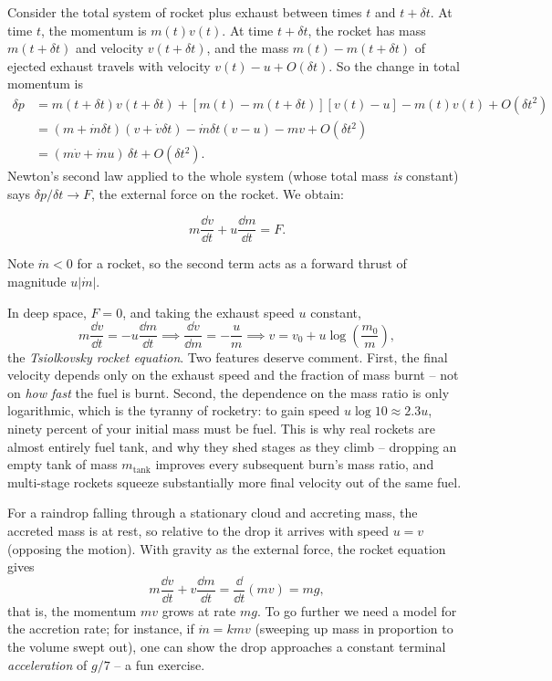 Consider the total system of rocket plus exhaust between times $t$ and $t + \delta t$. At time $t$, the momentum is $m(t)v(t)$. At time $t + \delta t$, the rocket has mass $m(t + \delta t)$ and velocity $v(t + \delta t)$, and the mass $m(t) - m(t + \delta t)$ of ejected exhaust travels with velocity $v(t) - u + O(\delta t)$. So the change in total momentum is
\begin{align*}
	\delta p &= m(t + \delta t)v(t + \delta t) + \left[m(t) - m(t+\delta t)\right]\left[v(t) - u\right] - m(t)v(t) + O(\delta t^2)\\
	&= (m + \dot{m}\delta t)(v + \dot{v}\delta t) - \dot{m}\delta t (v - u) - mv + O(\delta t^2)\\
	&= (m \dot{v} + \dot{m} u)\, \delta t + O(\delta t^2).
\end{align*}
Newton's second law applied to the whole system (whose total mass \emph{is} constant) says $\delta p / \delta t \to F$, the external force on the rocket. We obtain:

\begin{proposition}
	$$
	m \frac{\dd v}{\dd t} + u \frac{\dd m}{\dd t} = F.
	$$
\end{proposition}

Note $\dot{m} < 0$ for a rocket, so the second term acts as a forward thrust of magnitude $u|\dot m|$.

\begin{example}
	In deep space, $F = 0$, and taking the exhaust speed $u$ constant,
	$$
	m \frac{\dd v}{\dd t} = -u \frac{\dd m}{\dd t} \implies \frac{\dd v}{\dd m} = -\frac{u}{m} \implies v = v_0 + u \log\left(\frac{m_0}{m}\right),
	$$
	the \emph{Tsiolkovsky rocket equation}. Two features deserve comment. First, the final velocity depends only on the exhaust speed and the fraction of mass burnt -- not on \emph{how fast} the fuel is burnt. Second, the dependence on the mass ratio is only logarithmic, which is the tyranny of rocketry: to gain speed $u \log 10 \approx 2.3u$, ninety percent of your initial mass must be fuel. This is why real rockets are almost entirely fuel tank, and why they shed stages as they climb -- dropping an empty tank of mass $m_{\text{tank}}$ improves every subsequent burn's mass ratio, and multi-stage rockets squeeze substantially more final velocity out of the same fuel.
\end{example}

\begin{example}
	For a raindrop falling through a stationary cloud and accreting mass, the accreted mass is at rest, so relative to the drop it arrives with speed $u = v$ (opposing the motion). With gravity as the external force, the rocket equation gives
	$$
	m \frac{\dd v}{\dd t} + v\frac{\dd m}{\dd t} = \frac{\dd}{\dd t}(m v) = mg,
	$$
	that is, the momentum $mv$ grows at rate $mg$. To go further we need a model for the accretion rate; for instance, if $\dot m = k m v$ (sweeping up mass in proportion to the volume swept out), one can show the drop approaches a constant terminal \emph{acceleration} of $g/7$ -- a fun exercise.
\end{example}



